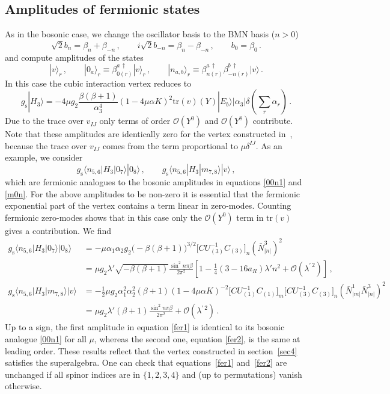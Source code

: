 \documentclass[12pt]{article}
\def\a{\alpha}
\def\b{\beta}
\def\d{\delta}
\def\m{\mu}
\def\tr{\mbox{tr}}
\def\l{\lambda}
\def\mc{\mathcal}
\def\la{\langle}
\def\ra{\rangle}
\def\dg{\dagger}
\numberwithin{equation}{section} \setlength{\textwidth}{17cm}
\begin{document}
\subsection{Amplitudes of fermionic states}\label{sec52}
As in the bosonic case, we change the oscillator basis to the BMN basis ($n>0$)
\begin{equation}
\sqrt{2}b_n=\b_n+\b_{-n}\,,\qquad i\sqrt{2}b_{-n}=\b_n-\b_{-n}\,,\qquad b_0=\b_0\,.
\end{equation}
and compute amplitudes of the states 
\begin{equation}
|v\ra_r\,,\qquad
|0_a\ra_r\equiv\b_{0(r)}^{a\,\dg}|v\ra_r\,,\qquad
|n_{a,b}\ra_r\equiv\b_{n(r)}^{a\,\dg}\b_{-n(r)}^{b\,\dg}|v\ra\,.
\end{equation}
In this case the cubic interaction vertex reduces to 
\begin{equation}
g_{\text{s}}|H_3\ra=-4\m g_2\frac{\b(\b+1)}{\a_3^4}(1-4\m\a K)^2\tr(v)(Y)|E_b\ra
|\a_3|\d\left(\sum_r\a_r\right)\,.
\end{equation}
Due to the trace over $v_{IJ}$ only terms of order ${\mc O}(Y^0)$ and
${\mc O}(Y^8)$ contribute. Note that these amplitudes are identically zero for the vertex 
constructed in~\cite{sv}, because the trace over $v_{IJ}$ comes from the term proportional 
to $\m\d^{IJ}$. 
As an example, we consider 
\begin{equation}\label{feramp}
g_{\text{s}}\la n_{5,6}|H_3|0_7\ra|0_8\ra\,,\qquad
g_{\text{s}}\la n_{5,6}|H_3|m_{7,8}\ra|v\ra\,,
\end{equation}
which are fermionic analogues to the bosonic amplitudes in equations \eqref{00n1} and
\eqref{m0n}. For the above amplitudes to be non-zero it is essential that the fermionic exponential part
of the vertex contains a term linear in zero-modes. 
Counting fermionic zero-modes shows that in this case only
the ${\mc O}(Y^0)$ term in $\tr(v)$ gives a contribution.
We find
\begin{align}
\label{fer1}
g_{\text{s}}\la n_{5,6}|H_3|0_7\ra|0_8\ra & =
-\m\a_1\a_2g_2\bigl(-\b(\b+1)\bigr)^{3/2}\bigl[CU_{(3)}^{-1}C_{(3)}\bigr]_n
\left(\bar{N}^3_{|n|}\right)^2\nonumber\\
&=\m g_2\l'\sqrt{-\b(\b+1)}\frac{\sin^2n\pi\b}{2\pi^2}\left[1-\frac{1}{4}(3-16a_R)
\l'n^2+{\mc O}(\l^{\prime\,2})\right]\,,\\
\label{fer2}
g_{\text{s}}\la n_{5,6}|H_3|m_{7,8}\ra|v\ra & =
-\frac{1}{2}\m g_2\a_1^2\a_2^2(\b+1)(1-4\m\a K)^{-2}
\bigl[CU_{(1)}^{-1}C_{(1)}\bigr]_m\bigl[CU_{(3)}^{-1}C_{(3)}\bigr]_n
\left(\bar{N}^1_{|m|}\bar{N}^3_{|n|}\right)^2\nonumber\\
&=\m g_2\l'(\b+1)\frac{\sin^2n\pi\b}{2\pi^2}+{\mc 
O}(\l^{\prime\,2})\,.
\end{align}
Up to a sign, the first amplitude in equation \eqref{fer1} is identical to its bosonic analogue \eqref{00n1} for all 
$\m$, whereas the second one, equation \eqref{fer2}, is the same at leading order. These results reflect that the 
vertex constructed in section~\ref{sec4} satisfies the superalgebra.
One can check
that equations~\eqref{fer1} and~\eqref{fer2} are unchanged if all spinor 
indices are in $\{1,2,3,4\}$ and (up to permutations) vanish otherwise.
 
\end{document}
